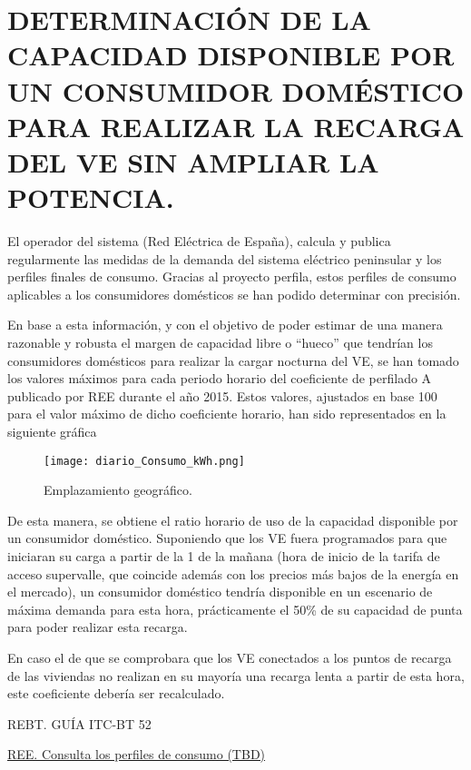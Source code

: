 \documentclass{article}
\begin{document}
\section*{DETERMINACIÓN DE LA CAPACIDAD DISPONIBLE POR UN CONSUMIDOR
DOMÉSTICO PARA REALIZAR LA RECARGA DEL VE SIN AMPLIAR LA POTENCIA.}


El operador del sistema (Red Eléctrica de España), calcula y publica regularmente las medidas de la demanda del
sistema eléctrico peninsular y los perfiles finales de consumo. Gracias al proyecto perfila, estos perfiles de consumo
aplicables a los consumidores domésticos se han podido determinar con precisión.

En base a esta información, y con el objetivo de poder estimar de una manera razonable y robusta el margen de
capacidad libre o “hueco” que tendrían los consumidores domésticos para realizar la cargar nocturna del VE, se han
tomado los valores máximos para cada periodo horario del coeficiente de perfilado A publicado por REE durante el
año 2015. Estos valores, ajustados en base 100 para el valor máximo de dicho coeficiente horario, han sido
representados en la siguiente gráfica

\begin{figure}[H]
    \centering
    \texttt{[image: diario\_Consumo\_kWh.png]} %
    \caption{Emplazamiento geográfico.}
    \label{fig:etiqueta}
  \end{figure}

De esta manera, se obtiene el ratio horario de uso de la capacidad disponible por un consumidor doméstico.
Suponiendo que los VE fuera programados para que iniciaran su carga a partir de la 1 de la mañana (hora de inicio
de la tarifa de acceso supervalle, que coincide además con los precios más bajos de la energía en el mercado), un
consumidor doméstico tendría disponible en un escenario de máxima demanda para esta hora, prácticamente el
50\% de su capacidad de punta para poder realizar esta recarga.

En caso el de que se comprobara que los VE conectados a los puntos de recarga de las viviendas no realizan en su
mayoría una recarga lenta a partir de esta hora, este coeficiente debería ser recalculado.


\begin{thebibliography}{9}
    REBT. GUÍA ITC-BT 52

    
    \href{https://www.ree.es/es/clientes/generador/gestion-medidas-electricas/consulta-perfiles-de-consumo}{REE. Consulta los perfiles de consumo (TBD)}

    

\end{thebibliography}
\end{document}
